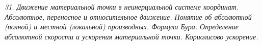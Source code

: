\emph{31. Движение материальной точки в неинерциальной системе координат.
Абсолютное, переносное и относительное движение. Понятие об абсолютной
(полной) и местной (локальной) производных. Формула Бура. Определение
абсолютной скорости и ускорения материальной точки. Кориолисово ускорение.}

\newpage
